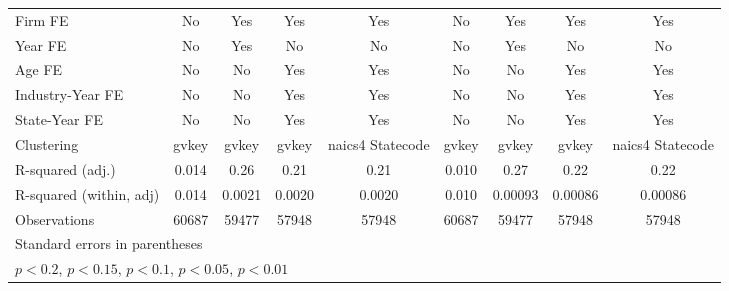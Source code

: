 {\begin{tabular}{l*{8}{c}}
\addlinespace
Firm FE             &          No         &         Yes         &         Yes         &         Yes         &          No         &         Yes         &         Yes         &         Yes         \\
\addlinespace
Year FE             &          No         &         Yes         &          No         &          No         &          No         &         Yes         &          No         &          No         \\
\addlinespace
Age FE              &          No         &          No         &         Yes         &         Yes         &          No         &          No         &         Yes         &         Yes         \\
\addlinespace
Industry-Year FE    &          No         &          No         &         Yes         &         Yes         &          No         &          No         &         Yes         &         Yes         \\
\addlinespace
State-Year FE       &          No         &          No         &         Yes         &         Yes         &          No         &          No         &         Yes         &         Yes         \\
\midrule
Clustering          &       gvkey         &       gvkey         &       gvkey         &naics4 Statecode         &       gvkey         &       gvkey         &       gvkey         &naics4 Statecode         \\
R-squared (adj.)    &       0.014         &        0.26         &        0.21         &        0.21         &       0.010         &        0.27         &        0.22         &        0.22         \\
R-squared (within, adj)&       0.014         &      0.0021         &      0.0020         &      0.0020         &       0.010         &     0.00093         &     0.00086         &     0.00086         \\
Observations        &       60687         &       59477         &       57948         &       57948         &       60687         &       59477         &       57948         &       57948         \\
\bottomrule
\multicolumn{9}{l}{\footnotesize Standard errors in parentheses}\\
\multicolumn{9}{l}{\footnotesize \sym{++} \(p<0.2\), \sym{+} \(p<0.15\), \sym{*} \(p<0.1\), \sym{**} \(p<0.05\), \sym{***} \(p<0.01\)}\\
\end{tabular}
}
